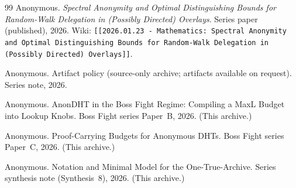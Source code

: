 \documentclass[11pt]{article}
\begin{document}
\begin{thebibliography}{99}
Anonymous.
\newblock \emph{Spectral Anonymity and Optimal Distinguishing Bounds for Random-Walk Delegation in (Possibly Directed) Overlays}.
\newblock Series paper (published), 2026.
\newblock Wiki: \texttt{[[2026.01.23 - Mathematics: Spectral Anonymity and Optimal Distinguishing Bounds for Random-Walk Delegation in (Possibly Directed) Overlays]]}.


Anonymous.
\newblock Artifact policy (source-only archive; artifacts available on request).
\newblock Series note, 2026.

Anonymous.
\newblock AnonDHT in the Boss Fight Regime: Compiling a MaxL Budget into Lookup Knobs.
\newblock Boss Fight series Paper~B, 2026. (This archive.)

Anonymous.
\newblock Proof-Carrying Budgets for Anonymous DHTs.
\newblock Boss Fight series Paper~C, 2026. (This archive.)

Anonymous.
\newblock Notation and Minimal Model for the One-True-Archive.
\newblock Series synthesis note (Synthesis~8), 2026. (This archive.)


\end{thebibliography}
\end{document}
